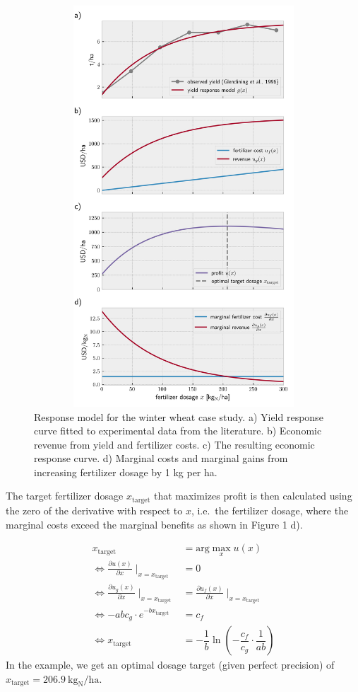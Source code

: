 \begin{figure}
\centering
\includegraphics[width=15cm,height=15cm,keepaspectratio]{imgs/synplot1.png}
\caption{Response model for the winter wheat case study. a) Yield response curve fitted to experimental data from the literature. b) Economic revenue from yield and fertilizer costs. c) The resulting economic response curve. d) Marginal costs and marginal gains from increasing fertilizer dosage by 1 kg per ha.}
\end{figure}

The target fertilizer dosage $x_\text{target}$ that maximizes profit is then calculated using the zero of the derivative with respect to $x$, i.e.~the fertilizer dosage, where the marginal costs exceed the marginal benefits as shown in Figure 1 d).

\begin{align}
    x_\text{target} &= \text{arg}\max_x u(x) \\
    \iff \frac{\partial u(x)}{\partial x} \mid_{x = x_\text{target}} &= 0\\
    \iff \frac{\partial u_g(x)}{\partial x} \mid_{x = x_\text{target}} &= \frac{\partial u_f(x)}{\partial x} \mid_{x = x_\text{target}}\\
    \iff -abc_g \cdot e^{-bx_\text{target}} &= c_f\\
    \iff x_\text{target} &=  -\dfrac{1}{b} \ln\left(-\dfrac{c_f}{c_g}\cdot\dfrac{1}{ab}\right)
\end{align} In the example, we get an optimal dosage target (given perfect precision) of $x_\text{target} = 206.9 \ \text{kg}_\text{N} / \text{ha}$.

